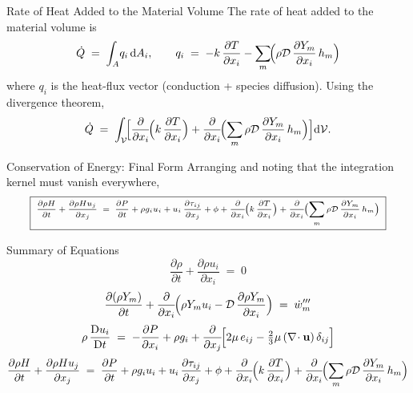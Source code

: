\documentclass[10pt,aspectratio=43]{beamer}
\newcommand{\dd}{\mathrm{d}}
\newcommand{\D}{\mathrm{D}}
\newcommand{\pd}[2]{\frac{\partial #1}{\partial #2}}
\newcommand{\bu}{\mathbf{u}}
\newcommand{\divg}{\nabla\!\cdot}
\newcommand{\Vol}{\mathcal{V}}
\begin{document}
\begin{frame}{Rate of Heat Added to the Material Volume}
  The rate of heat added to the material volume is
  \[
    \dot{Q} \;=\; \int_{A}\! q_{i}\,\dd A_{i}, \qquad
    q_{i} \;=\; -k\,\pd{T}{x_{i}} - \sum_{m}\!\Bigl(\rho\mathcal{D}\,\pd{Y_{m}}{x_{i}}\,h_{m}\Bigr)
  \]
  where $q_{i}$ is the heat-flux vector (conduction + species diffusion).
  Using the divergence theorem,
  \[
    \dot{Q} \;=\; \int_{\Vol}\!\Bigl[\pd{}{x_{i}}\!\Bigl(k\,\pd{T}{x_{i}}\Bigr)
                + \pd{}{x_{i}}\!\Bigl(\sum_{m}\rho\mathcal{D}\,\pd{Y_{m}}{x_{i}}\,h_{m}\Bigr)\Bigr]\dd\Vol.
  \]
\end{frame}

\begin{frame}{Conservation of Energy: Final Form}
  Arranging and noting that the integration kernel must vanish everywhere,
  \[
    \scriptsize
    \boxed{\;
      \pd{\rho H}{t} + \pd{\rho H u_{j}}{x_{j}}
        \;=\; \pd{P}{t} + \rho g_{i}u_{i} + u_{i}\,\pd{\tau_{ij}}{x_{j}} + \phi
              + \pd{}{x_{i}}\!\Bigl(k\,\pd{T}{x_{i}}\Bigr)
              + \pd{}{x_{i}}\!\Bigl(\sum_{m}\rho\mathcal{D}\,\pd{Y_{m}}{x_{i}}\,h_{m}\Bigr)
    \;}
  \]
\end{frame}

\begin{frame}{Summary of Equations}
  \footnotesize
  \[
    \pd{\rho}{t} + \pd{\rho u_{i}}{x_{i}} \;=\; 0
  \]
  \[
    \pd{(\rho Y_{m})}{t} + \pd{}{x_{i}}\!\Bigl(\rho Y_{m}u_{i} - \mathcal{D}\,\pd{\rho Y_{m}}{x_{i}}\Bigr)
      \;=\; \dot{w}'''_{m}
  \]
  \[
    \rho\,\frac{\D u_{i}}{\D t}
      \;=\; -\pd{P}{x_{i}} + \rho g_{i}
            + \pd{}{x_{j}}\!\Bigl[2\mu\,e_{ij} - \tfrac{2}{3}\mu\,(\divg\bu)\,\delta_{ij}\Bigr]
  \]
  \[
    \pd{\rho H}{t} + \pd{\rho H u_{j}}{x_{j}}
      \;=\; \pd{P}{t} + \rho g_{i}u_{i} + u_{i}\,\pd{\tau_{ij}}{x_{j}} + \phi
            + \pd{}{x_{i}}\!\Bigl(k\,\pd{T}{x_{i}}\Bigr)
            + \pd{}{x_{i}}\!\Bigl(\sum_{m}\rho\mathcal{D}\,\pd{Y_{m}}{x_{i}}\,h_{m}\Bigr)
  \]
\end{frame}
\end{document}
